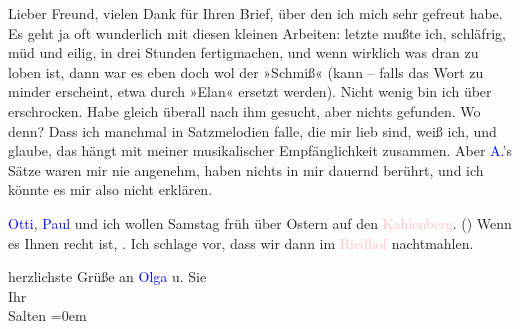 \pstart
           Lieber Freund, vielen Dank für Ihren Brief, über den ich mich sehr
               gefreut habe. Es geht ja oft wunderlich mit diesen kleinen Arbeiten: \label{K_L03394-1v}\label{K_L03394-1h} letzte mußte ich, schläfrig, müd und eilig,
               in drei Stunden fertigmachen, und wenn wirklich was dran zu loben ist, dann war es
               eben doch wol der »Schmiß« (kann – falls das Wort zu minder erscheint, etwa durch
               »Elan« ersetzt werden). Nicht wenig bin ich über \label{K_L03394-2v}\label{K_L03394-2h} erschrocken. Habe gleich überall nach ihm gesucht, aber nichts gefunden. Wo
               denn? Dass ich manchmal in Satzmelodien falle, die mir lieb sind, weiß ich, und
               glaube, das hängt mit meiner musikalischer Empfänglichkeit zusammen. Aber \textcolor{blue}{A.}{}\ledrightnote{\textcolor{blue}{Peter Altenberg}}’s Sätze waren mir nie angenehm, haben nichts
               in mir dauernd berührt, und ich könnte es mir also nicht erklären.\pend
           
\pstart
           \textcolor{blue}{Otti}{}\ledrightnote{\textcolor{blue}{Ottilie Salten}}, \textcolor{blue}{Paul}{}\ledrightnote{\textcolor{blue}{Paul Salten}} und ich wollen Samstag früh über Ostern
               auf den \textcolor{pink}{Kahlenberg}{}\ledrightnote{\textcolor{pink}{Kahlenberg}}. (\label{K_L03394-3v}\label{K_L03394-3h}) Wenn es Ihnen recht ist, \label{K_L03394-4v}\label{K_L03394-4h}. Ich schlage vor, dass wir dann im \textcolor{pink}{Riedhof}{}\ledrightnote{\textcolor{pink}{Riedhof}}
               nachtmahlen.\pend
           
\pstart
           herzlichste Grüße an \textcolor{blue}{Olga}{}\ledrightnote{\textcolor{blue}{Olga Schnitzler}} u. Sie {\\[\baselineskip]}Ihr {\\[\baselineskip]}\spacefill\mbox{Salten}\pend
           \leftskip=0em{}\endnumbering{}  
      